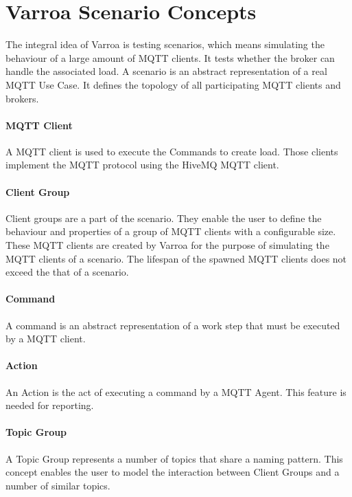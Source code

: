 
\section{Varroa Scenario Concepts}
The integral idea of Varroa is testing scenarios, which means simulating the behaviour of a large amount of MQTT clients.
It tests whether the broker can handle the associated load.
A scenario is an abstract representation of a real MQTT Use Case.
It defines the topology of all participating MQTT clients and brokers.

\paragraph{MQTT Client}
A MQTT client is used to execute the Commands to create load.
Those clients implement the MQTT protocol using the HiveMQ MQTT client.

\paragraph{Client Group}
Client groups are a part of the scenario.
They enable the user to define the behaviour and properties of a group of MQTT clients with a configurable size.
These MQTT clients are created by Varroa for the purpose of simulating the MQTT clients of a scenario.
The lifespan of the spawned MQTT clients does not exceed the that of a scenario.

\paragraph{Command}
A command is an abstract representation of a work step that must be executed by a MQTT client.

\paragraph{Action}
An Action is the act of executing a command by a MQTT Agent.
This feature is needed for reporting.

\paragraph{Topic Group}
A Topic Group represents a number of topics that share a naming pattern.
This concept enables the user to model the interaction between Client Groups and a number of similar topics.

